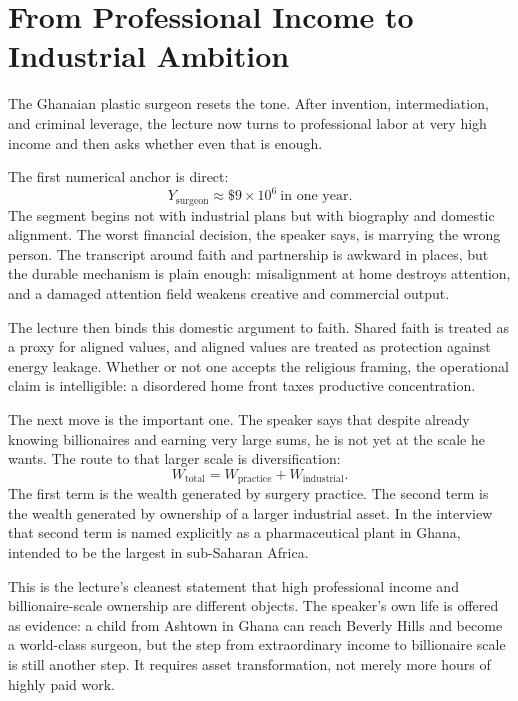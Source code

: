 \section{From Professional Income to Industrial Ambition}

The Ghanaian plastic surgeon resets the tone. After invention, intermediation, and criminal leverage, the lecture now turns to professional labor at very high income and then asks whether even that is enough.

The first numerical anchor is direct:
\begin{equation}
Y_{\mathrm{surgeon}}\approx \$9\times 10^6 \ \text{in one year}.
\end{equation}
The segment begins not with industrial plans but with biography and domestic alignment. The worst financial decision, the speaker says, is marrying the wrong person. The transcript around faith and partnership is awkward in places, but the durable mechanism is plain enough: misalignment at home destroys attention, and a damaged attention field weakens creative and commercial output.

The lecture then binds this domestic argument to faith. Shared faith is treated as a proxy for aligned values, and aligned values are treated as protection against energy leakage. Whether or not one accepts the religious framing, the operational claim is intelligible: a disordered home front taxes productive concentration.

The next move is the important one. The speaker says that despite already knowing billionaires and earning very large sums, he is not yet at the scale he wants. The route to that larger scale is diversification:
\begin{equation}
W_{\mathrm{total}} = W_{\mathrm{practice}} + W_{\mathrm{industrial}}.
\end{equation}
The first term is the wealth generated by surgery practice. The second term is the wealth generated by ownership of a larger industrial asset. In the interview that second term is named explicitly as a pharmaceutical plant in Ghana, intended to be the largest in sub-Saharan Africa.

This is the lecture's cleanest statement that high professional income and billionaire-scale ownership are different objects. The speaker's own life is offered as evidence: a child from Ashtown in Ghana can reach Beverly Hills and become a world-class surgeon, but the step from extraordinary income to billionaire scale is still another step. It requires asset transformation, not merely more hours of highly paid work.


